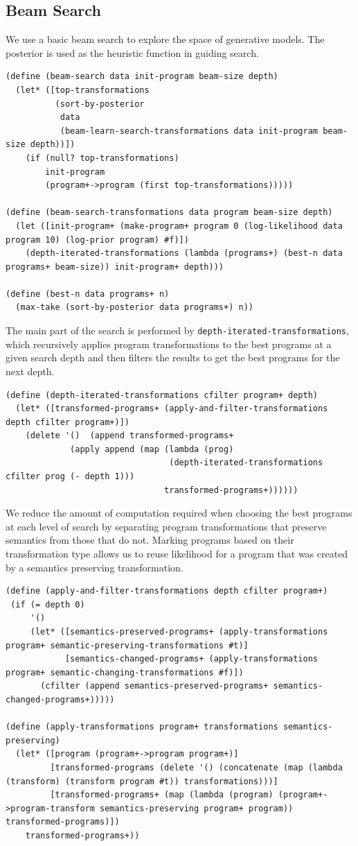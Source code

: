 \documentclass[a4paper,10pt]{article}
\begin{document}
\subsection{Beam Search}
We use a basic beam search to explore the space of generative models.  The posterior is used as the heuristic function in guiding search.
\begin{lstlisting}[frame=trBL]
(define (beam-search data init-program beam-size depth)
  (let* ([top-transformations 
          (sort-by-posterior
           data 
           (beam-learn-search-transformations data init-program beam-size depth))])
    (if (null? top-transformations)
        init-program
        (program+->program (first top-transformations)))))

(define (beam-search-transformations data program beam-size depth)
  (let ([init-program+ (make-program+ program 0 (log-likelihood data program 10) (log-prior program) #f)])
    (depth-iterated-transformations (lambda (programs+) (best-n data programs+ beam-size)) init-program+ depth)))

(define (best-n data programs+ n)
  (max-take (sort-by-posterior data programs+) n))
\end{lstlisting}
The main part of the search is performed by \texttt{depth-iterated-transformations}, which recursively applies program transformations to the best programs at a given search depth and then filters the results to get the best programs for the next depth.
\begin{lstlisting}[frame=trBL]
(define (depth-iterated-transformations cfilter program+ depth)
  (let* ([transformed-programs+ (apply-and-filter-transformations depth cfilter program+)])
    (delete '()  (append transformed-programs+
             (apply append (map (lambda (prog) 
                                 (depth-iterated-transformations cfilter prog (- depth 1))) 
                                transformed-programs+))))))
\end{lstlisting}
We reduce the amount of computation required when choosing the best programs at each level of search by separating program transformations that preserve semantics from those that do not.  Marking programs based on their transformation type allows us to reuse likelihood for a program that was created by a semantics preserving transformation.
\begin{lstlisting}[frame=trBL]
(define (apply-and-filter-transformations depth cfilter program+)
 (if (= depth 0)
     '()
     (let* ([semantics-preserved-programs+ (apply-transformations program+ semantic-preserving-transformations #t)]
            [semantics-changed-programs+ (apply-transformations program+ semantic-changing-transformations #f)])
       (cfilter (append semantics-preserved-programs+ semantics-changed-programs+)))))

(define (apply-transformations program+ transformations semantics-preserving)
  (let* ([program (program+->program program+)]
         [transformed-programs (delete '() (concatenate (map (lambda (transform) (transform program #t)) transformations)))]
         [transformed-programs+ (map (lambda (program) (program+->program-transform semantics-preserving program+ program)) transformed-programs)])
    transformed-programs+))
\end{lstlisting}
\end{document}
